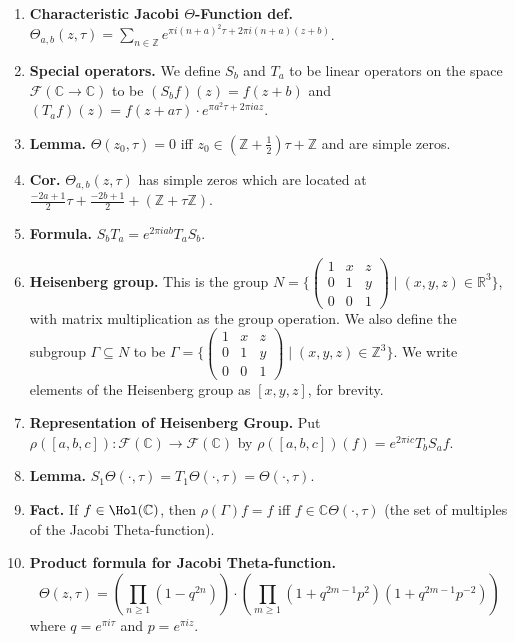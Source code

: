 \begin{enumerate}
	\item \textbf{Characteristic Jacobi $\Theta$-Function def. } $\Theta_{a,b}(z,\tau) = \sum_{n \in \mathbb{Z}} e^{\pi i(n+a)^2 \tau + 2\pi i(n+a)(z+b)}$. 
	\item \textbf{Special operators. } We define $S_b$ and $T_a$ to be linear operators on the space $\mathscr{F}(\mathbb{C} \to \mathbb{C})$ to be $(S_b f)(z) = f(z+b)$ and $(T_a f)(z) = f(z+a\tau) \cdot e^{\pi a^2 \tau + 2\pi i az}$. 
	\item \textbf{Lemma. } $\Theta(z_0,\tau) = 0$ iff $z_0 \in (\mathbb{Z} + \frac{1}{2})\tau + \mathbb{Z}$ and are simple zeros. 
	\item \textbf{Cor. } $\Theta_{a,b}(z,\tau)$ has simple zeros which are located at $\frac{-2a+1}{2}\tau + \frac{-2b+1}{2} + (\mathbb{Z} + \tau\mathbb{Z})$. 
	\item \textbf{Formula. } $S_b T_a = e^{2\pi iab} T_a S_b$. 
	\item \textbf{Heisenberg group. } This is the group $N = \{
	\begin{pmatrix}
	1 & x & z \\
	0 & 1 & y \\
	0 & 0 & 1
	\end{pmatrix}
	\mid (x,y,z) \in \mathbb{R}^3\}$, with matrix multiplication as the group operation. We also define the subgroup $\Gamma \subseteq N$ to be $\Gamma = \{
	\begin{pmatrix}
	1 & x & z \\
	0 & 1 & y \\
	0 & 0 & 1
	\end{pmatrix}
	\mid (x,y,z) \in \mathbb{Z}^3 \}$. We write elements of the Heisenberg group as $[x,y,z]$, for brevity. 
	\item \textbf{Representation of Heisenberg Group. } Put $\rho([a,b,c]): \mathscr{F}(\mathbb{C}) \to \mathscr{F}(\mathbb{C})$ by $\rho([a,b,c])(f) = e^{2\pi i c} T_b S_a f$. 
	\item \textbf{Lemma. } $S_1 \Theta(\cdot, \tau) = T_1 \Theta(\cdot, \tau) = \Theta(\cdot, \tau)$. 
	\item \textbf{Fact. } If $f \in \Hol(\mathbb{C})$, then $\rho(\Gamma)f = f$ iff $f \in \mathbb{C} \Theta(\cdot, \tau)$ (the set of multiples of the Jacobi Theta-function). 
	\item \textbf{Product formula for Jacobi Theta-function. } 
	$$
		\Theta(z,\tau) = \left(\prod_{n \geq 1}(1 - q^{2n})\right) \cdot \left(\prod_{m \geq 1}(1+q^{2m-1}p^2)(1+q^{2m-1}p^{-2})\right)
	$$
	where $q = e^{\pi i \tau}$ and $p = e^{\pi i z}$. 
\end{enumerate}  
 

